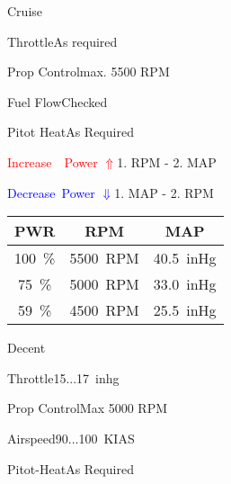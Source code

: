\begin{checklist}{Cruise}
  \item{Throttle}{As required}
  \item{Prop Control}{max. 5500 RPM}
  \item{Fuel Flow}{Checked}
  \item{Pitot Heat}{As Required}

  \item{\textcolor{red}{Increase~~Power $\Uparrow$}}{1. RPM - 2. MAP}
  \item{\textcolor{blue}{Decrease~Power $\Downarrow$}}{1. MAP - 2. RPM}
    
\end{checklist}

\begin{table}[!ht]
  \large
  \centering
  \begin{tabular}{|c|c|c|}
  \hline
  \cellcolor{black!90}\color{white}\textbf{PWR} & \cellcolor{black!90}\color{white}\textbf{RPM}  & \cellcolor{black!90}\color{white}\textbf{MAP} \\ \hline

  100~\% & 5500~RPM & 40.5~inHg \\ \hline
  75~\% & 5000~RPM & 33.0~inHg \\ \hline
  59~\% & 4500~RPM & 25.5~inHg \\ \hline

  \end{tabular}
\end{table}


\begin{checklist}{Decent}
  \item{Throttle}{15...17~inhg}
  \item{Prop Control}{Max 5000 RPM}
  \item{Airspeed}{90...100~KIAS}
  \item{Pitot-Heat}{As Required}
\end{checklist}

